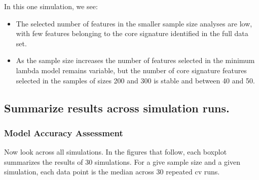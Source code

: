 \documentclass[
]{book}
\begin{document}
In this one simulation, we see:

\begin{itemize}
\item
  The selected number of features in the smaller sample size analyses
  are low, with few features belonging to the core signature identified in the
  full data set.
\item
  As the sample size increases the number of features selected in the minimum
  lambda model remains variable, but the number of core signature features
  selected in the samples of sizes 200 and 300 is stable and between 40 and 50.
\end{itemize}

\hypertarget{summarize-results-across-simulation-runs.}{%
\subsection{Summarize results across simulation runs.}\label{summarize-results-across-simulation-runs.}}

\hypertarget{model-accuracy-assessment-1}{%
\subsubsection{Model Accuracy Assessment}\label{model-accuracy-assessment-1}}

Now look across all simulations. In the figures that follow, each boxplot
summarizes the results of 30 simulations. For a give sample size and a
given simulation, each data point is the median across 30 repeated cv runs.
\end{document}
